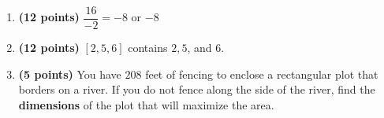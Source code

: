 \documentclass[12pt]{amsart}
\begin{document}
\begin{enumerate}
\vfill 
\def \a{7}\def \atwoone{1}\def \atwotwo{3}\def \atwothree{2}\def \btwothree{6}\def \sumtwothree{8}\def \diftwothree{-4}\def \bigtwothree{200}\def \powtwothree{36}\def \logtwothree{0.3868528072345416}\def \factortwothree{119}\def \atwofour{1.99}\def \btwofour{1.722}\def \tooshorttwofour{10.1}\def \moneytwofour{10.10}\def \longertwofour{10.10000}\def \atwofive{0.12}\def \btwofive{0.12346}\def \athreeone{6}\def \bthreeone{8}\def \setthreetwo{[12, 6, 9]}\def \athreetwo{12}\def \bthreetwo{6}\def \cthreetwo{9}\def \controlthreethree{5}\def \athreethree{3}\def \topthreethree{0}\def \athreefour{5}\def \bthreefour{2}\def \listthreefour{[1, 2, 3, 4]}\def \afourone{16}\def \bfourone{-2}\def \fracfourone{-8}\def \rootfourtwo{12}\def \simplifiedfourtwo{2 \sqrt{3}}\def \sqrtlistfourtwo{[2, 3]}\def \outfourtwo{2}\def \infourtwo{3}\def \wowfourtwo{1}\def \afourthree{5}\def \nicethreefour{3x^{2}-x^{}+5}\def \nastythreefour{xyz^{3}+5}\def \cfourthree{4}\def \dfourthree{9}\def \infourthree{4x^{}}\def \outfourthree{+9y^{}}\def \afourfour{1203896}\def \nicefourfour{1,203,896}\def \goodfourfour{1,000,000.12345}\def \badfourfour{1,000,000.1}
\item {\bf (12 points)} 
 $\dfrac{\afourone}{\bfourone} = \fracfourone$ or $\displaystyle \fracfourone$ 

\vfill 
\def \a{7}\def \atwoone{2}\def \atwotwo{3}\def \atwothree{1}\def \btwothree{7}\def \sumtwothree{8}\def \diftwothree{-6}\def \bigtwothree{100}\def \powtwothree{7}\def \logtwothree{0.0}\def \factortwothree{38}\def \atwofour{1.57}\def \btwofour{1.496}\def \tooshorttwofour{10.1}\def \moneytwofour{10.10}\def \longertwofour{10.10000}\def \atwofive{0.12}\def \btwofive{0.12346}\def \athreeone{4}\def \bthreeone{3}\def \setthreetwo{[2, 5, 6]}\def \athreetwo{2}\def \bthreetwo{5}\def \cthreetwo{6}\def \controlthreethree{-8}\def \athreethree{1}\def \topthreethree{1}\def \athreefour{4}\def \bthreefour{3}\def \listthreefour{[1, 2, 3, 5]}\def \afourone{4}\def \bfourone{-2}\def \fracfourone{-2}\def \rootfourtwo{12}\def \simplifiedfourtwo{2 \sqrt{3}}\def \sqrtlistfourtwo{[2, 3]}\def \outfourtwo{2}\def \infourtwo{3}\def \wowfourtwo{1}\def \afourthree{-5}\def \nicethreefour{3x^{2}-x^{}-5}\def \nastythreefour{xyz^{3}-5}\def \cfourthree{4}\def \dfourthree{10}\def \infourthree{4x^{}}\def \outfourthree{+10y^{}}\def \afourfour{1482487}\def \nicefourfour{1,482,487}\def \goodfourfour{1,000,000.12345}\def \badfourfour{1,000,000.1}
\item {\bf (12 points)} 
 $\setthreetwo$ contains $\athreetwo,\bthreetwo$, and $\cthreetwo$. 
\vfill 
\newpage\def \x{52}\def \y{104}\def \L{208}\def \area{5408}
\item {\bf (5 points)} 
 You have $\L$ feet of fencing to enclose a rectangular plot that borders on a river. If you do not fence along the side of the river, find the \textbf{dimensions} of the plot that will maximize the area. \\


\end{enumerate}
\end{document}
